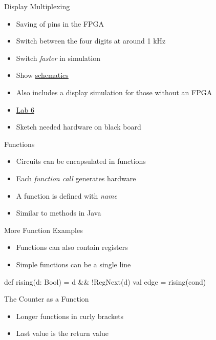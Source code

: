 \begin{frame}[fragile]{Display Multiplexing}
\begin{itemize}
\item Saving of pins in the FPGA
\item Switch between the four digits at around 1 kHz
\item Switch \emph{faster} in simulation
\item Show \href{https://digilent.com/reference/basys3/refmanual#basic_io}{schematics}
\item Also includes a display simulation for those without an FPGA
\item \href{https://github.com/schoeberl/chisel-lab/tree/master/lab6}{Lab 6}
\item Sketch needed hardware on black board
\end{itemize}
\end{frame}

\begin{frame}[fragile]{Functions}
\begin{itemize}
\item Circuits can be encapsulated in functions
\item Each \emph{function call} generates hardware
\item A function is defined with  \emph{name}
\item Similar to methods in Java
\end{itemize}
\end{frame}

\begin{frame}[fragile]{More Function Examples}
\begin{itemize}
\item Functions can also contain registers
\item Simple functions can be a single line
\end{itemize}

\begin{chisel}
  def rising(d: Bool) = d && !RegNext(d)
  val edge = rising(cond)
\end{chisel}
\end{frame}

\begin{frame}[fragile]{The Counter as a Function}
\begin{itemize}
\item Longer functions in curly brackets
\item Last value is the return value
\end{itemize}
\end{frame}

